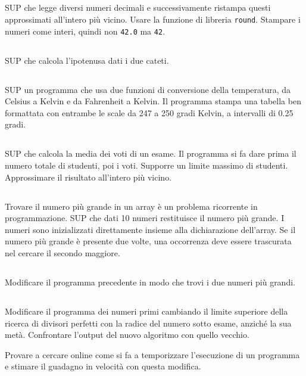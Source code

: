 \documentclass{article}
\begin{document}
\subsection{}
SUP che legge diversi numeri decimali e successivamente ristampa questi approssimati all'intero più vicino. Usare la funzione di libreria \texttt{round}. Stampare i numeri come interi, quindi non \texttt{42.0} ma \texttt{42}.

\subsection{}
SUP che calcola l'ipotenusa dati i due cateti. 

\subsection{}
SUP un programma che usa due funzioni di conversione della temperatura, da Celsius a Kelvin e da Fahrenheit a Kelvin. Il programma stampa una tabella ben formattata con entrambe le scale da 247 a 250 gradi Kelvin, a intervalli di 0.25 gradi.

\subsection{}
SUP che calcola la media dei voti di un esame. Il programma si fa dare prima il numero totale di studenti, poi i voti. Supporre un limite massimo di studenti. Approssimare il risultato all'intero più vicino. 

\subsection{}
Trovare il numero più grande in un array è un problema ricorrente in programmazione. SUP che dati 10 numeri restituisce il numero più grande. I numeri sono inizializzati direttamente insieme alla dichiarazione dell'array. Se il numero più grande è presente due volte, una occorrenza deve essere trascurata nel cercare il secondo maggiore. 

\subsection{}
Modificare il programma precedente in modo che trovi i due numeri più grandi.

\subsection{}
Modificare il programma dei numeri primi cambiando il limite superiore della ricerca di divisori perfetti con la radice del numero sotto esame, anziché la sua metà. Confrontare l'output del nuovo algoritmo con quello vecchio. 
\begin{info} 
	Provare a cercare online come si fa a temporizzare l'esecuzione di un programma e stimare il guadagno in velocità con questa modifica.
\end{info}
\end{document}
